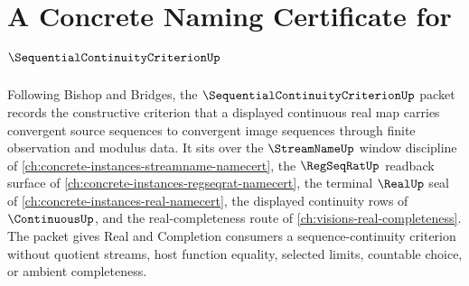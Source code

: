 \chapter{A Concrete Naming Certificate for $\SequentialContinuityCriterionUp$}
\label{ch:concrete-instances-sequential-continuity-criterion-namecert}

Following Bishop and Bridges, the $\SequentialContinuityCriterionUp$ packet records the constructive criterion that a displayed continuous real map carries convergent source sequences to convergent image sequences through finite observation and modulus data. It sits over the $\StreamNameUp$ window discipline of \autoref{ch:concrete-instances-streamname-namecert}, the $\RegSeqRatUp$ readback surface of \autoref{ch:concrete-instances-regseqrat-namecert}, the terminal $\RealUp$ seal of \autoref{ch:concrete-instances-real-namecert}, the displayed continuity rows of $\ContinuousUp$, and the real-completeness route of \autoref{ch:visions-real-completeness}. The packet gives Real and Completion consumers a sequence-continuity criterion without quotient streams, host function equality, selected limits, countable choice, or ambient completeness.

